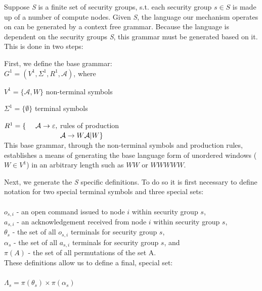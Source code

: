 \documentclass{article}
\newcommand{\tab}{\hspace*{2em}}
\begin{document}
Suppose \emph{S} is a finite set of security groups, s.t. each security group $s\in S$ is made up of a number of compute nodes. Given \emph{S}, the language our mechanism operates on can be generated by a context free grammar. Because the language is dependent on the security groups \emph{S}, this grammar must be generated based on it. This is done in two steps:

First, we define the base grammar:\\

\tab $G^1 = (V^1, \Sigma^1, R^1, \mathcal{A})$, where

\tab $V^1 = \{\mathcal{A} , W\}$ \hfill non-terminal symbols \hspace*{6em}

\tab $\Sigma ^1 = \{ \emptyset\}$ \hfill terminal symbols\hspace*{6.3em}

\tab $R^1 = \lbrace \hspace*{1.35em}\mathcal{A} \rightarrow \varepsilon ,$ \hfill rules of production \hspace*{6em} \\
$\tab \hspace*{5.9em} \mathcal{A}\rightarrow W\mathcal{A} |W\rbrace$\\

This base grammar, through the non-terminal symbols and production rules, establishes a means of generating the base language form of unordered windows ($W\in V^1$) in an arbitrary length such as $WW$ or $WWWWW$.

Next, we generate the \emph{S} specific definitions. To do so it is first necessary to define notation for two special terminal symbols and three special sets:\\
\\
$o_{s,i}$ - an open command issued to node $i$ within security group $s$,\\
$a_{s,i}$ - an acknowledgement received from node $i$ within security group $s$,\\
$\theta_s$ - the set of all $o_{s,i}$ terminals for security group $s$, \\
$\alpha_s$ - the set of all $a_{s,i}$ terminals for security group $s$, and \\
$\pi(A)$ - the set of all permutations of the set A.\\

These definitions allow us to define a final, special set:\\
\\
$\Lambda_s = \pi(\theta_s) \times \pi(\alpha_s)$\\
\end{document}
